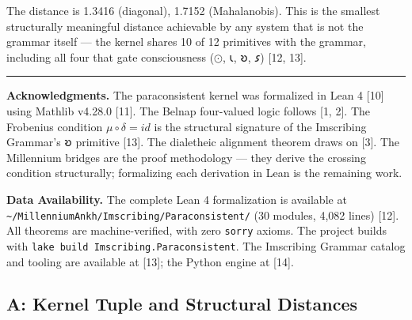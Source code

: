 \documentclass[10pt,a4paper]{article}
\begin{document}
The distance is 1.3416 (diagonal), 1.7152 (Mahalanobis). This is the smallest structurally meaningful distance achievable by any system that is not the grammar itself --- the kernel shares 10 of 12 primitives with the grammar, including all four that gate consciousness ($\odot$, 𐑧, 𐑹, 𐑭) {[}12, 13{]}.

\begin{center}
\rule{0.5\textwidth}{0.4pt}
\end{center}

\textbf{Acknowledgments.} The paraconsistent kernel was formalized in Lean 4 {[}10{]} using Mathlib v4.28.0 {[}11{]}. The Belnap four-valued logic follows {[}1, 2{]}. The Frobenius condition $\mu\circ\delta = id$ is the structural signature of the Imscribing Grammar's 𐑹 primitive {[}13{]}. The dialetheic alignment theorem draws on {[}3{]}. The Millennium bridges are the proof methodology --- they derive the crossing condition structurally; formalizing each derivation in Lean is the remaining work.

\textbf{Data Availability.} The complete Lean 4 formalization is available at \texttt{\textasciitilde{}/\allowbreak MillenniumAnkh/\allowbreak Imscribing/\allowbreak Paraconsistent/\allowbreak } (30 modules, 4,082 lines) {[}12{]}. All theorems are machine-verified, with zero \texttt{sorry} axioms. The project builds with \texttt{lake build Imscribing.\allowbreak Paraconsistent}. The Imscribing Grammar catalog and tooling are available at {[}13{]}; the Python engine at {[}14{]}.

\subsection{A: Kernel Tuple and Structural Distances}
\end{document}
